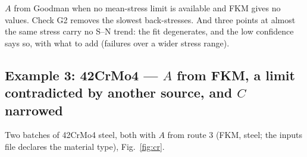 \documentclass[11pt,a4paper]{article}
\begin{document}
\begin{lesson}
$A$ from Goodman when no mean-stress limit is available and FKM gives no values. Check G2 removes the slowest
back-stresses. And three points at almost the same stress carry no S--N trend: the fit degenerates, and the low
confidence says so, with what to add (failures over a wider stress range).
\end{lesson}

\FloatBarrier
\subsection*{Example 3: 42CrMo4 --- $A$ from FKM, a limit contradicted by another source, and $C$ narrowed}
Two batches of 42CrMo4 steel, both with $A$ from route 3 (FKM, steel; the inputs file declares the material type),
Fig.~\ref{fig:cr}.
\end{document}
